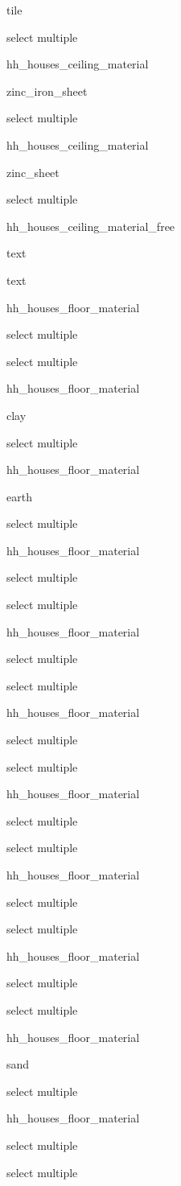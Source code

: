 \documentclass[]{article}
\begin{document}
tile

select multiple

hh\_houses\_ceiling\_material

zinc\_iron\_sheet

select multiple

hh\_houses\_ceiling\_material

zinc\_sheet

select multiple

hh\_houses\_ceiling\_material\_free

text

text

hh\_houses\_floor\_material

select multiple

select multiple

hh\_houses\_floor\_material

clay

select multiple

hh\_houses\_floor\_material

earth

select multiple

hh\_houses\_floor\_material

select multiple

select multiple

hh\_houses\_floor\_material

select multiple

select multiple

hh\_houses\_floor\_material

select multiple

select multiple

hh\_houses\_floor\_material

select multiple

select multiple

hh\_houses\_floor\_material

select multiple

select multiple

hh\_houses\_floor\_material

select multiple

select multiple

hh\_houses\_floor\_material

sand

select multiple

hh\_houses\_floor\_material

select multiple

select multiple
\end{document}
